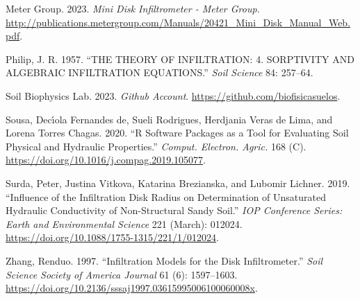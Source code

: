 \documentclass[
]{article}
\newlength{\cslhangindent}
\newlength{\cslentryspacingunit} %
\newenvironment{CSLReferences}[2] %
 {%
  \setlength{\parindent}{0pt}
  \ifodd #1
  \let\oldpar\par
  \def\par{\hangindent=\cslhangindent\oldpar}
  \fi
  \setlength{\parskip}{#2\cslentryspacingunit}
 }%
 {}
\begin{document}
\begin{CSLReferences}{1}{0}
\leavevmode{}%
Meter Group. 2023. \emph{Mini Disk Infiltrometer - Meter Group}.
\url{http://publications.metergroup.com/Manuals/20421_Mini_Disk_Manual_Web.pdf}.

\leavevmode{}%
Philip, J. R. 1957. {``THE THEORY OF INFILTRATION: 4. SORPTIVITY AND
ALGEBRAIC INFILTRATION EQUATIONS.''} \emph{Soil Science} 84: 257--64.

\leavevmode{}%
Soil Biophysics Lab. 2023. \emph{Github Account}.
\url{https://github.com/biofisicasuelos}.

\leavevmode{}%
Sousa, Decı́ola Fernandes de, Sueli Rodrigues, Herdjania Veras de Lima,
and Lorena Torres Chagas. 2020. {``R Software Packages as a Tool for
Evaluating Soil Physical and Hydraulic Properties.''} \emph{Comput.
Electron. Agric.} 168 (C).
\url{https://doi.org/10.1016/j.compag.2019.105077}.

\leavevmode{}%
Surda, Peter, Justina Vitkova, Katarina Brezianska, and Lubomir Lichner.
2019. {``Influence of the Infiltration Disk Radius on Determination of
Unsaturated Hydraulic Conductivity of Non-Structural Sandy Soil.''}
\emph{{IOP} Conference Series: Earth and Environmental Science} 221
(March): 012024. \url{https://doi.org/10.1088/1755-1315/221/1/012024}.

\leavevmode{}%
Zhang, Renduo. 1997. {``Infiltration Models for the Disk
Infiltrometer.''} \emph{Soil Science Society of America Journal} 61 (6):
1597--1603.
\url{https://doi.org/10.2136/sssaj1997.03615995006100060008x}.

\end{CSLReferences}
\end{document}
